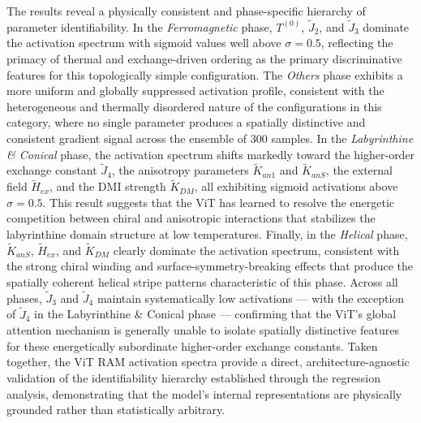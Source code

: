 \documentclass[final,5p,times,twocolumn]{elsarticle}
\begin{document}
The results reveal a physically consistent and
phase-specific hierarchy of parameter identifiability.
In the \textit{Ferromagnetic} phase, $T^{(0)}$,
$\tilde{J}_2$, and $\tilde{J}_3$ dominate the
activation spectrum with sigmoid values well above
$\sigma = 0.5$, reflecting the primacy of thermal and
exchange-driven ordering as the primary discriminative
features for this topologically simple configuration.
The \textit{Others} phase exhibits a more uniform and
globally suppressed activation profile, consistent with
the heterogeneous and thermally disordered nature of
the configurations in this category, where no single
parameter produces a spatially distinctive and
consistent gradient signal across the ensemble of
300 samples. In the \textit{Labyrinthine \& Conical}
phase, the activation spectrum shifts markedly toward
the higher-order exchange constant $\tilde{J}_4$,
the anisotropy parameters $\tilde{K}_{an1}$ and
$\tilde{K}_{anS}$, the external field $\tilde{H}_{ex}$,
and the DMI strength $\tilde{K}_{DM}$, all exhibiting
sigmoid activations above $\sigma = 0.5$. This result
suggests that the ViT has learned to resolve the
energetic competition between chiral and anisotropic
interactions that stabilizes the labyrinthine domain
structure at low temperatures. Finally, in the
\textit{Helical} phase, $\tilde{K}_{anS}$,
$\tilde{H}_{ex}$, and $\tilde{K}_{DM}$ clearly
dominate the activation spectrum, consistent with
the strong chiral winding and surface-symmetry-breaking
effects that produce the spatially coherent helical
stripe patterns characteristic of this phase.
Across all phases, $\tilde{J}_3$ and $\tilde{J}_4$
maintain systematically low activations --- with the
exception of $\tilde{J}_4$ in the Labyrinthine \&
Conical phase --- confirming that the ViT's global
attention mechanism is generally unable to isolate
spatially distinctive features for these energetically
subordinate higher-order exchange constants. Taken
together, the ViT RAM activation spectra provide a
direct, architecture-agnostic validation of the
identifiability hierarchy established through the
regression analysis, demonstrating that the model's
internal representations are physically grounded
rather than statistically arbitrary.
\end{document}
